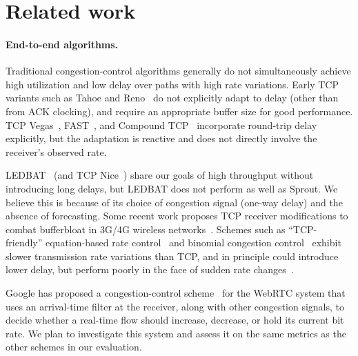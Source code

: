 \section{Related work}
\label{sprout:related}

\paragraph{End-to-end algorithms.}

Traditional congestion-control algorithms generally do not
simultaneously achieve high utilization and low delay over paths with
high rate variations.
Early TCP variants such as Tahoe and Reno~\cite{Jacobson88} do not
explicitly adapt to delay (other than from ACK clocking), and require
an appropriate buffer size for good performance. TCP
Vegas~\cite{Brakmo94}, FAST~\cite{FAST}, and Compound TCP~\cite{CTCP}
incorporate round-trip delay explicitly, but the adaptation is
reactive and does not directly involve the receiver's observed rate.

LEDBAT~\cite{ledbat} (and TCP Nice~\cite{tcpnice}) share our goals of
high throughput without introducing long delays, but LEDBAT does not
perform as well as Sprout. We believe this is because of its choice of
congestion signal (one-way delay) and the absence of forecasting.
Some recent work proposes TCP receiver modifications to combat
bufferbloat in 3G/4G wireless networks~\cite{tcpbufferbloat}.
Schemes such as ``TCP-friendly'' equation-based
rate control~\cite{ebcc} and binomial congestion
control~\cite{binomial} exhibit slower transmission rate variations
than TCP, and in principle could introduce lower delay, but perform
poorly in the face of sudden rate changes~\cite{slowcc-dynamic}.

Google has proposed a congestion-control scheme~\cite{WebRTCdraft} for
the WebRTC system that uses an arrival-time filter at the receiver,
along with other congestion signals, to decide whether a real-time
flow should increase, decrease, or hold its current bit rate. We plan
to investigate this system and assess it on the same metrics as the
other schemes in our evaluation.

